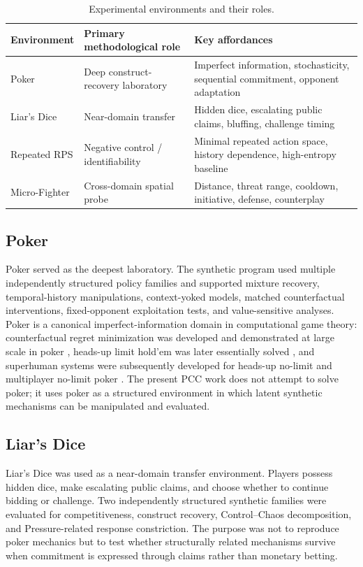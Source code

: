 \documentclass[journal]{IEEEtran}
\begin{document}
\begin{table}[t]
\caption{Experimental environments and their roles.}
\label{tab:environments}
\centering
\begin{tabular}{lL{4.2cm}L{8.5cm}}
\toprule
\textbf{Environment} & \textbf{Primary methodological role} & \textbf{Key affordances} \\
\midrule
Poker & Deep construct-recovery laboratory & Imperfect information, stochasticity, sequential commitment, opponent adaptation \\
Liar's Dice & Near-domain transfer & Hidden dice, escalating public claims, bluffing, challenge timing \\
Repeated RPS & Negative control / identifiability & Minimal repeated action space, history dependence, high-entropy baseline \\
Micro-Fighter & Cross-domain spatial probe & Distance, threat range, cooldown, initiative, defense, counterplay \\
\bottomrule
\end{tabular}
\end{table}

\subsection{Poker}

Poker served as the deepest laboratory. The synthetic program used multiple independently structured policy families and supported mixture recovery, temporal-history manipulations, context-yoked models, matched counterfactual interventions, fixed-opponent exploitation tests, and value-sensitive analyses. Poker is a canonical imperfect-information domain in computational game theory: counterfactual regret minimization was developed and demonstrated at large scale in poker \cite{zinkevich2007}, heads-up limit hold'em was later essentially solved \cite{bowling2015}, and superhuman systems were subsequently developed for heads-up no-limit and multiplayer no-limit poker \cite{brown2018,brown2019}. The present PCC work does not attempt to solve poker; it uses poker as a structured environment in which latent synthetic mechanisms can be manipulated and evaluated.

\subsection{Liar's Dice}

Liar's Dice was used as a near-domain transfer environment. Players possess hidden dice, make escalating public claims, and choose whether to continue bidding or challenge. Two independently structured synthetic families were evaluated for competitiveness, construct recovery, Control--Chaos decomposition, and Pressure-related response constriction. The purpose was not to reproduce poker mechanics but to test whether structurally related mechanisms survive when commitment is expressed through claims rather than monetary betting.
\end{document}
